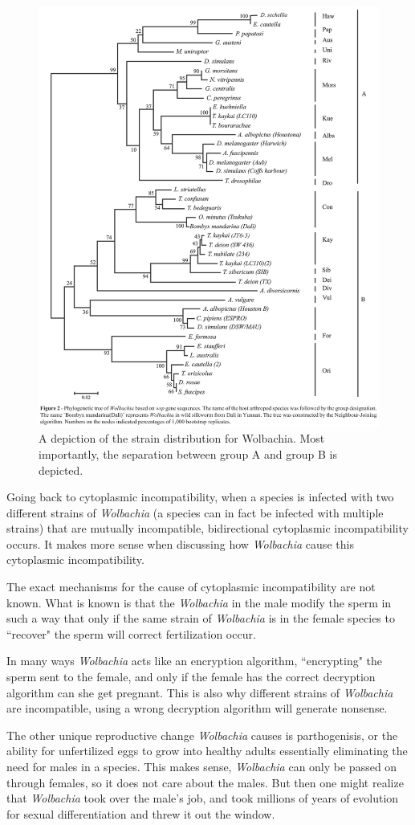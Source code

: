 \documentclass[twocolumn]{article}
\begin{document}
\begin{figure}[!ht]
    \centering
    \includegraphics[width=.4\textwidth]{images/WolbachiaTree.jpg}
    \caption{ A depiction of the strain distribution for Wolbachia. Most importantly, the separation between group A and group B is depicted. \cite{Wtree_image} }
    \label{fig:wolbachia_tree}
\end{figure}

Going back to cytoplasmic incompatibility, when a species is infected with two different strains of \textit{Wolbachia} (a species can in fact be infected with multiple strains) that are mutually incompatible, bidirectional cytoplasmic incompatibility occurs.\cite{WbiCI} It makes more sense when discussing how \textit{Wolbachia} cause this cytoplasmic incompatibility.

The exact mechanisms for the cause of cytoplasmic incompatibility are not known. What is known is that the \textit{Wolbachia} in the male modify the sperm in such a way that only if the same strain of \textit{Wolbachia} is in the female species to ``recover" the sperm will correct fertilization occur.\cite{Wbio}

In many ways \textit{Wolbachia} acts like an encryption algorithm, ``encrypting" the sperm sent to the female, and only if the female has the correct decryption algorithm can she get pregnant. This is also why different strains of \textit{Wolbachia} are incompatible, using a wrong decryption algorithm will generate nonsense.

The other unique reproductive change \textit{Wolbachia} causes is parthogenisis, or the ability for unfertilized eggs to grow into healthy adults essentially eliminating the need for males in a species. This makes sense, \textit{Wolbachia} can only be passed on through females, so it does not care about the males. But then one might realize that \textit{Wolbachia} took over the male's job, and took millions of years of evolution for sexual differentiation and threw it out the window.
\end{document}

